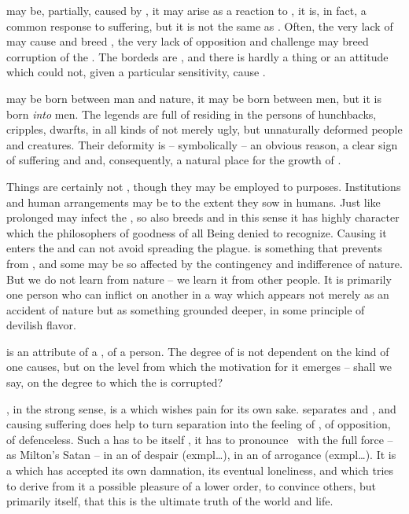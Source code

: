 {\pa {} may be, partially, caused by , it may arise as
a reaction to , it is, in fact, a common response to
suffering, but it is not the same as .  Often, the very lack
of  may cause  and breed , the very
lack of opposition and challenge may breed corruption of the
.  The bordeds are , and there is hardly a
thing or an attitude which could not, given a particular sensitivity,
cause .

 may be born between man and nature, it may be born between
men, but it is born {\em into} men.  The legends are full of 
residing in the persons of hunchbacks, cripples, dwarfts, in all kinds
of not merely ugly, but unnaturally deformed people and creatures. 
Their deformity is -- symbolically -- an obvious reason, a clear sign of suffering and
 and, consequently, a natural place for the growth of
.

\pa\label{pa:noevilthings}
Things are certainly not , though they may be employed to 
 purposes. Institutions and human 
arrangements may be  to the extent they sow  in humans. Just 
like prolonged  may infect the , so also  
breeds  and in this sense it has highly  
character which the philosophers of goodness of all Being denied to 
recognize. Causing  it enters the  and  can not avoid spreading the plague.
 is something that prevents  from  
, and some  may be so affected by 
the contingency and indifference of nature. But we do not learn 
 from nature -- we learn it from other people.
It is primarily one person who can inflict  on another in a 
way which appears not merely as an accident of nature but as 
something grounded deeper, in some  principle of devilish 
flavor.

 is an attribute of a , of a person.  The
degree of  is not dependent on the kind of  one
causes, but on the level from which the motivation for it emerges -- 
shall we say, on the degree to which the  is corrupted?


\pa\label{pa:ultevil} \inv {}, in the strong sense, is a  which
wishes pain for its own sake.   separates and , and
causing suffering does help to turn separation into the feeling of
, of opposition, of defenceless.  Such a  has to be
itself , it has to pronounce \No\ with the full force -- as
Milton's Satan  --
in an  of despair (exmpl\ldots), in an  of  arrogance
(exmpl\ldots).  It is a  which has accepted its own damnation, its
eventual loneliness, and which tries to derive from it a possible pleasure of a
lower order, to convince others, but primarily itself, that this is the ultimate
truth of the world and life.


}
